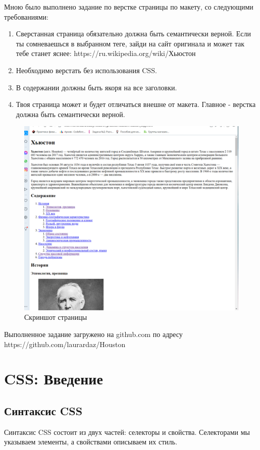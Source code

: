 \documentclass[14pt]{extreport}
\begin{document}
Мною было выполнено задание по верстке страницы по макету, со следующими требованиями:
\begin{enumerate}
\item Сверстанная страница обязательно должна быть семантически верной. Если ты сомневаешься в выбранном теге, зайди на сайт оригинала и может так тебе станет яснее: https://ru.wikipedia.org/wiki/Хьюстон
\item Необходимо верстать без использования CSS.
\item В содержании должны быть якоря на все заголовки.
\item Твоя страница может и будет отличаться внешне от макета. Главное - верстка должна быть семантически верной.
\end{enumerate}

\begin{figure}[H]
\centerline{\includegraphics[width=0.7\linewidth]{pics_practice/houston.png}}
\caption{Скриншот страницы}
\label{6}
\end{figure}

Выполненное задание загружено на github.com по адресу https://github.com/laurardaz/Houston




\chapter{CSS: Введение}
\section{Синтаксис CSS}

Синтаксис CSS состоит из двух частей: селекторы и свойства. Селекторами мы указываем элементы, а свойствами описываем их стиль.
\end{document}
